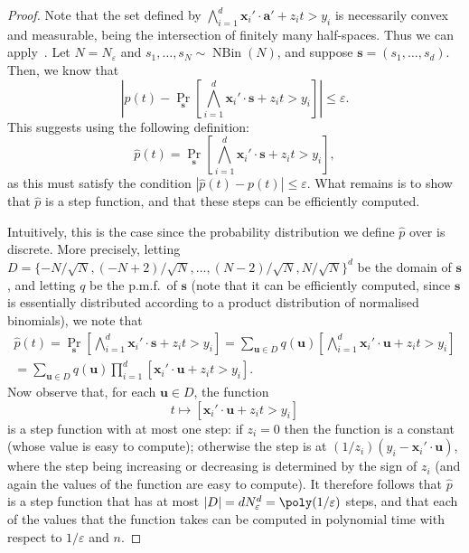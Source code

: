 \documentclass[a4paper,11pt, DIV=11]{scrartcl}
\newcommand{\vx}{\ensuremath{\mathbf{x}}}
\newcommand{\va}{\ensuremath{\mathbf{a}}}
\renewcommand{\epsilon}{\varepsilon}
\DeclareMathOperator{\NBin}{NBin}
\theoremstyle{plain}
\theoremstyle{definition}
\begin{document}
\begin{proof}
    Note that the set defined by $\bigwedge_{i = 1}^d \vx_i' \cdot \va' + z_i t
    > y_i$ is necessarily convex and measurable, being the intersection of
    finitely many half-spaces. Thus we can apply~. Let $N = N_\epsilon$ and $s_1, \ldots, s_N \sim \NBin(N)$, and suppose $\mathbf{s} = (s_1, \ldots, s_d)$. Then, we know that 
    \[
    \left| p(t) - \Pr_{\mathbf{s}}\left[ \bigwedge_{i=1}^d \vx_i' \cdot \mathbf{s} + z_i t > y_i \right] \right| \leq \epsilon.
    \]
    This suggests using the following definition:
    \[
    \widehat{p}(t) =  \Pr_{\mathbf{s}}\left[ \bigwedge_{i=1}^d \vx_i' \cdot \mathbf{s} + z_i t > y_i  \right],
    \]
    as this must satisfy the condition
    $| \widehat{p}(t) - p(t)| \leq \epsilon$. What remains is to show that $\widehat{p}$ is a step function, and that these steps can be efficiently computed.

    Intuitively, this is the case since the probability distribution we define $\widehat{p}$ over is discrete. More precisely, letting $D = {\{ -N/\sqrt{N}, (-N+2)/\sqrt{N}, \ldots, (N-2)/\sqrt{N}, N/\sqrt{N} \}}^d$ be the domain of $\mathbf{s}$, and letting $q$ be the p.m.f.~of $\mathbf{s}$ (note that it can be efficiently computed, since $\mathbf{s}$ is essentially distributed according to a product distribution of normalised binomials), we note that
    \begin{multline*}
    \widehat{p}(t) =  \Pr_{\mathbf{s}}\left[ \bigwedge_{i=1}^d \vx_i' \cdot \mathbf{s}  + z_i t > y_i \right]
    =
    \sum_{\mathbf{u} \in D}  q(\mathbf{u}) \left[ \bigwedge_{i = 1}^d \vx_i' \cdot \mathbf{u} + z_i t > y_i \right]
    \\=
    \sum_{\mathbf{u} \in D} q(\mathbf{u}) \prod_{i = 1}^d \left[ \mathbf{x}_i' \cdot \mathbf{u} + z_i t > y_i \right].
    \end{multline*}
    Now observe that, for each $\mathbf{u} \in D$, the function
    \[
    t \mapsto \left[ \mathbf{x}_i' \cdot \mathbf{u} + z_i t > y_i \right]
    \]
    is a step function with at most one step: if $z_i = 0$ then the function is a constant (whose value is easy to compute); otherwise the step is at $(1/z_i) (y_i - \vx_i' \cdot \mathbf{u})$, where the step being increasing or decreasing is determined by the sign of $z_i$ (and again the values of the function are easy to compute). It therefore follows that $\widehat{p}$ is a step function that has at most $|D| = d N_\epsilon^d = \poly(1 / \epsilon)$ steps, and that each of the values that the function takes can be computed in polynomial time with respect to $1 / \epsilon$ and $n$.
\end{proof}
\end{document}

